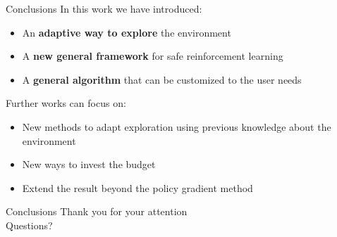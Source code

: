 \documentclass{beamer}
\begin{document}
\begin{frame}{Conclusions}
In this work we have introduced:
\begin{itemize}
\item An \textbf{adaptive way to explore} the environment
\item A \textbf{new general framework} for safe reinforcement learning
\item A \textbf{general algorithm} that can be customized to the user needs
\end{itemize}
\vfill
Further works can focus on:
\begin{itemize}
\item New methods to adapt exploration using previous knowledge about the environment
\item New ways to invest the budget
\item Extend the result beyond the policy gradient method
\end{itemize}

\end{frame}

%
%

\begin{frame}{Conclusions}
\centering
\LARGE Thank you for your attention\\
\vspace{2cm}
Questions?
\end{frame}
\end{document}
